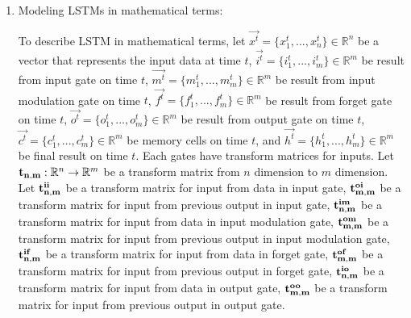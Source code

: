\documentclass[draft,dvipsnames]{drexel-thesis}
\begin{document}
\begin{thesis}
\begin{enumerate}



\item Modeling LSTMs in mathematical terms:

	To describe LSTM in mathematical terms, let $\vec{x^t} = \{ x_1^t, ..., x_n^t\} \in \mathbb{R}^n$ be a vector that represents the input data at time $t$, $\vec{i^t} = \{i_1^t, ..., i_m^t\} \in \mathbb{R}^m$ be result from input gate on time $t$, $\vec{m^t} = \{m_1^t, ..., m_m^t\} \in \mathbb{R}^m$ be result from input modulation gate on time $t$, $\vec{f^t} = \{f_1^t, ..., f_m^t\} \in \mathbb{R}^m$ be result from forget gate on time $t$, $\vec{o^t} = \{o_1^t, ..., o_m^t\} \in \mathbb{R}^m$ be result from output gate on time $t$, $\vec{c^t} = \{c_1^t, ..., c_m^t\} \in \mathbb{R}^m$ be memory cells on time $t$, and $\vec{h^t} = \{h_1^t, ..., h_m^t\} \in \mathbb{R}^m$ be final result on time $t$.
Each gates have transform matrices for inputs. Let $\bold{t_{n,m}}: \mathbb{R}^n \rightarrow \mathbb{R}^m$ be a transform matrix from $n$ dimension to $m$ dimension. Let $\bold{t_{n,m}^{ii}}$ be a transform matrix for input from data in input gate, $\bold{t_{m,m}^{oi}}$ be a transform matrix for input from previous output in input gate, $\bold{t_{n,m}^{im}}$ be a transform matrix for input from data in input modulation gate, $\bold{t_{m,m}^{om}}$ be a transform matrix for input from previous output in input modulation gate, $\bold{t_{n,m}^{if}}$ be a transform matrix for input from data in forget gate, $\bold{t_{m,m}^{of}}$ be a transform matrix for input from previous output in forget gate, $\bold{t_{n,m}^{io}}$ be a transform matrix for input from data in output gate, $\bold{t_{m,m}^{oo}}$ be a transform matrix for input from previous output in output gate.


\end{enumerate}
\end{thesis}
\end{document}
